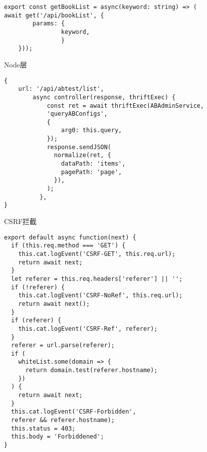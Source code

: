 \begin{lstlisting}[numberstyle=\tiny,keywordstyle=\color{blue!70},
    commentstyle=\color{red!50!green!50!blue!50},frame=shadowbox,
    rulesepcolor=\color{red!20!green!20!blue!20},basicstyle=\ttfamily]
export const getBookList = async(keyword: string) => (
await get('/api/bookList', {
        params: {
                keyword,
                }
    }));
\end{lstlisting}
Node层

\begin{lstlisting}[numberstyle=\tiny,keywordstyle=\color{blue!70},
    commentstyle=\color{red!50!green!50!blue!50},frame=shadowbox,
    rulesepcolor=\color{red!20!green!20!blue!20},basicstyle=\ttfamily]
{
    url: '/api/abtest/list',
        async controller(response, thriftExec) {
            const ret = await thriftExec(ABAdminService,
            'queryABConfigs',
            {
                arg0: this.query,
            });
            response.sendJSON(
              normalize(ret, {
                dataPath: 'items',
                pagePath: 'page',
              }),
            );
          },
}   
\end{lstlisting}

CSRF拦截

\begin{lstlisting}[numberstyle=\tiny,keywordstyle=\color{blue!70},
    commentstyle=\color{red!50!green!50!blue!50},frame=shadowbox,
    rulesepcolor=\color{red!20!green!20!blue!20},basicstyle=\ttfamily]
export default async function(next) {
  if (this.req.method === 'GET') {
    this.cat.logEvent('CSRF-GET', this.req.url);
    return await next;
  }
  let referer = this.req.headers['referer'] || '';
  if (!referer) {
    this.cat.logEvent('CSRF-NoRef', this.req.url);
    return await next();
  }
  if (referer) {
    this.cat.logEvent('CSRF-Ref', referer);
  }
  referer = url.parse(referer);
  if (
    whiteList.some(domain => {
      return domain.test(referer.hostname);
    })
  ) {
    return await next;
  }
  this.cat.logEvent('CSRF-Forbidden',
  referer && referer.hostname);
  this.status = 403;
  this.body = 'Forbiddened';
}
\end{lstlisting}